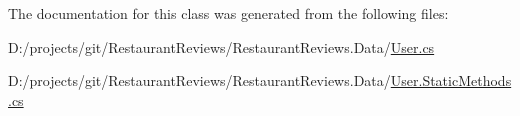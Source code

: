 The documentation for this class was generated from the following files\+:\begin{DoxyCompactItemize}
\item 
D\+:/projects/git/\+Restaurant\+Reviews/\+Restaurant\+Reviews.\+Data/\hyperlink{_user_8cs}{User.\+cs}\item 
D\+:/projects/git/\+Restaurant\+Reviews/\+Restaurant\+Reviews.\+Data/\hyperlink{_user_8_static_methods_8cs}{User.\+Static\+Methods.\+cs}\end{DoxyCompactItemize}
